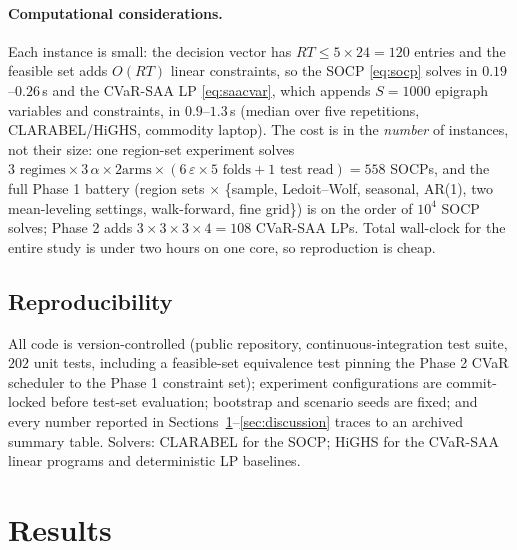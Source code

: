 \documentclass[12pt]{article}
\begin{document}
\paragraph{Computational considerations.} Each instance is small: the decision
vector has $RT\le 5\times24=120$ entries and the feasible set adds $O(RT)$ linear
constraints, so the SOCP \eqref{eq:socp} solves in $0.19$--$0.26$\,s and the
CVaR-SAA LP \eqref{eq:saacvar}, which appends $S=1000$ epigraph variables and
constraints, in $0.9$--$1.3$\,s (median over five repetitions, CLARABEL/HiGHS,
commodity laptop). The cost is in the \emph{number} of instances, not their size:
one region-set experiment solves $3\text{ regimes}\times3\,\alpha\times2\text{
arms}\times(6\,\varepsilon\times5\text{ folds}+1\text{ test read})=558$ SOCPs, and
the full Phase 1 battery (region sets $\times$ \{sample, Ledoit--Wolf, seasonal,
AR(1), two mean-leveling settings, walk-forward, fine grid\}) is on the order of $10^4$ SOCP
solves; Phase 2 adds $3\times3\times3\times4=108$ CVaR-SAA LPs. Total wall-clock for
the entire study is under two hours on one core, so reproduction is cheap.

\subsection{Reproducibility}\label{sec:repro}
All code is version-controlled (public repository, continuous-integration test
suite, $202$ unit tests, including a feasible-set equivalence test pinning the
Phase 2 CVaR scheduler to the Phase 1 constraint set); experiment configurations
are commit-locked before test-set evaluation; bootstrap and scenario seeds are
fixed; and every number reported in
Sections~\ref{sec:results}--\ref{sec:discussion} traces to an archived summary
table. Solvers: CLARABEL for the SOCP; HiGHS for the CVaR-SAA linear programs
and deterministic LP baselines.

\section{Results}\label{sec:results}
\end{document}

